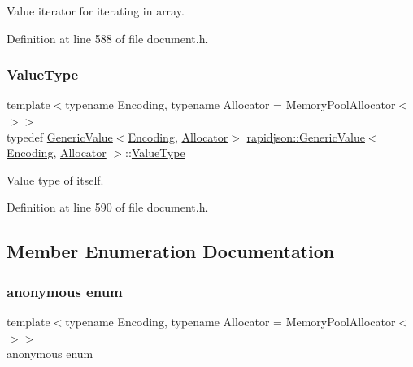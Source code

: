 Value iterator for iterating in array. 



Definition at line 588 of file document.\+h.

\mbox{\label{classrapidjson_1_1_generic_value_ad2935191ab28c2c2e472b739a9d58202}} 
\subsubsection{\texorpdfstring{ValueType}{ValueType}}
{\footnotesize\ttfamily template$<$typename Encoding, typename Allocator = Memory\+Pool\+Allocator$<$$>$$>$ \\
typedef \mbox{\hyperlink{classrapidjson_1_1_generic_value}{Generic\+Value}}$<$\mbox{\hyperlink{classrapidjson_1_1_encoding}{Encoding}}, \mbox{\hyperlink{classrapidjson_1_1_allocator}{Allocator}}$>$ \mbox{\hyperlink{classrapidjson_1_1_generic_value}{rapidjson\+::\+Generic\+Value}}$<$ \mbox{\hyperlink{classrapidjson_1_1_encoding}{Encoding}}, \mbox{\hyperlink{classrapidjson_1_1_allocator}{Allocator}} $>$\+::\mbox{\hyperlink{classrapidjson_1_1_generic_value_ad2935191ab28c2c2e472b739a9d58202}{Value\+Type}}}



Value type of itself. 



Definition at line 590 of file document.\+h.



\subsection{Member Enumeration Documentation}
\mbox{\label{classrapidjson_1_1_generic_value_aeedcc5ea216f2f8f1c02c49065dab0ea}} 
\subsubsection{\texorpdfstring{anonymous enum}{anonymous enum}}
{\footnotesize\ttfamily template$<$typename Encoding, typename Allocator = Memory\+Pool\+Allocator$<$$>$$>$ \\
anonymous enum}


